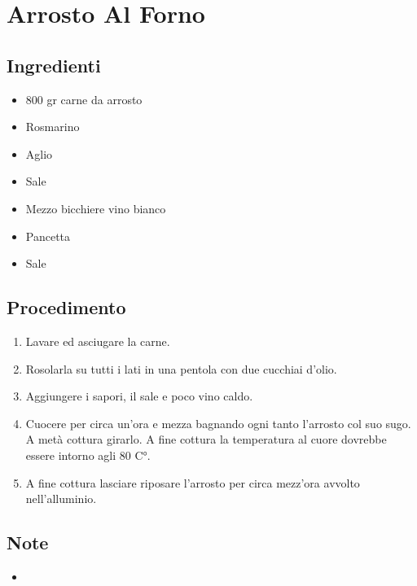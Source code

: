 \section{Arrosto Al Forno}
\subsection{Ingredienti}
\begin{itemize}
\item 800 gr carne da arrosto  
\item Rosmarino  
\item Aglio  
\item Sale  
\item Mezzo bicchiere vino bianco  
\item Pancetta  
\item Sale
\end{itemize}
\subsection{Procedimento}
\begin{enumerate}
\item  Lavare ed asciugare la carne.  
\item  Rosolarla su tutti i lati in una pentola con due cucchiai d'olio.  
\item  Aggiungere i sapori, il sale e poco vino caldo.  
\item  Cuocere per circa un'ora e mezza bagnando ogni tanto l'arrosto col suo sugo. A metà cottura girarlo. A fine cottura la temperatura al cuore dovrebbe essere intorno agli 80 C°.  
\item  A fine cottura lasciare riposare l'arrosto per circa mezz'ora avvolto nell'alluminio.
\end{enumerate}
\subsection{Note}
\begin{itemize}
\item 
\end{itemize}
